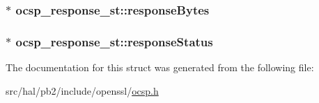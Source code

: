 \subsubsection[{\texorpdfstring{response\+Bytes}{responseBytes}}]{$\ast$ ocsp\+\_\+response\+\_\+st\+::response\+Bytes}\hypertarget{structocsp__response__st_a4724a80cc511a45789534e55588e5b9c}{}\label{structocsp__response__st_a4724a80cc511a45789534e55588e5b9c}
\subsubsection[{\texorpdfstring{response\+Status}{responseStatus}}]{$\ast$ ocsp\+\_\+response\+\_\+st\+::response\+Status}\hypertarget{structocsp__response__st_a5c79d6dd4c93fb0946fc1e94467589fe}{}\label{structocsp__response__st_a5c79d6dd4c93fb0946fc1e94467589fe}


The documentation for this struct was generated from the following file\+:\begin{DoxyCompactItemize}
\item 
src/hal/pb2/include/openssl/\hyperlink{ocsp_8h}{ocsp.\+h}\end{DoxyCompactItemize}
